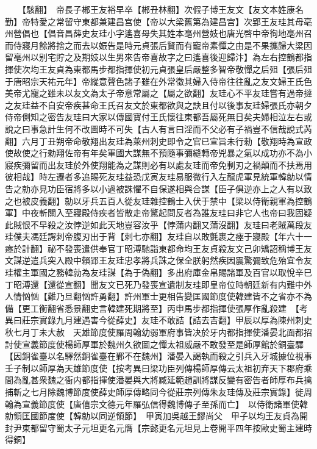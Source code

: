　　【駭翻】　帝長子郴王友裕早卒【郴丑林翻】次假子博王友文【友文本姓康名勤】帝特愛之常留守東都兼建昌宫使【帝以大梁舊第為建昌宫】次郢王友珪其母亳州營倡也【倡音昌薛史友珪小字遙喜母失其姓本亳州營妓也唐光啓中帝徇地亳州召而侍寢月餘將捨之而去以娠告是時元貞張后賢而有寵帝素憚之由是不果攜歸大梁因留亳州以别宅貯之及期妓以生男來告帝喜故字之曰遙喜後迎歸汴】為左右控鶴都指揮使次均王友貞為東都馬步都指揮使初元貞張皇后嚴整多智帝敬憚之后殂【張后殂于唐昭宗天祐元年】帝縱意聲色諸子雖在外常徵其婦入侍帝往往亂之友文婦王氏色美帝尤寵之雖未以友文為太子帝意常屬之【屬之欲翻】友珪心不平友珪嘗有過帝撻之友珪益不自安帝疾甚命王氏召友文於東都欲與之訣且付以後事友珪婦張氏亦朝夕侍帝側知之密告友珪曰大家以傳國寶付王氏懷往東都吾屬死無日矣夫婦相泣左右或說之曰事急計生何不改圖時不可失【古人有言曰淫而不父必有子禍豈不信哉說式芮翻】六月丁丑朔帝命敬翔出友珪為萊州刺史即令之官已宣旨未行勑【敬翔時為宣政使故使之行勑翔佐帝有年矣軍國大謀無不預隨事彌縫轉帝兇暴之氣以成功亦不為小寢疾彌留而出友珪於外使翔能為之謀則必有以處友珪而帝免剚刃之禍顛而不扶焉用彼相哉】時左遷者多追賜死友珪益恐戊寅友珪易服微行入左龍虎軍見統軍韓勍以情告之勍亦見功臣宿將多以小過被誅懼不自保遂相與合謀【臣子俱逆亦上之人有以致之也被皮義翻】勍以牙兵五百人從友珪雜控鶴士入伏于禁中【梁以侍衛親軍為控鶴軍】中夜斬關入至寢殿侍疾者皆散走帝驚起問反者為誰友珪曰非它人也帝曰我固疑此賊恨不早殺之汝悖逆如此天地豈容汝乎【悖蒲内翻又蒲沒翻】友珪曰老賊萬段友珪僕夫馮廷諤刺帝腹刃出于背【刺七亦翻】友珪自以敗氈裹之瘞于寢殿【年六十一瘞於計翻】祕不發喪遣供奉官丁昭溥馳詣東都命均王友貞殺友文己卯矯詔稱博王友文謀逆遣兵突入殿中賴郢王友珪忠孝將兵誅之保全朕躬然疾因震驚彌致危殆宜令友珪權主軍國之務韓勍為友珪謀【為于偽翻】多出府庫金帛賜諸軍及百官以取悅辛巳丁昭溥還【還從宣翻】聞友文已死乃發喪宣遺制友珪即皇帝位時朝廷新有内難中外人情忷忷【難乃旦翻忷許勇翻】許州軍士更相告變匡國節度使韓建皆不之省亦不為備【更工衡翻省悉景翻史言韓建死期將至】丙申馬步都指揮使張厚作亂殺建　【考異曰莊宗實錄九月建遇害今從薛史】友珪不敢詰【詰去吉翻】甲辰以厚為陳州刺史　秋七月丁未大赦　天雄節度使羅周翰幼弱軍府事皆决於牙内都指揮使潘晏北面都招討使宣義節度使楊師厚軍於魏州久欲圖之憚太祖威嚴不敢發至是師厚館於銅臺驛【因銅雀臺以名驛然銅雀臺在鄴不在魏州】潘晏入謁執而殺之引兵入牙城據位視事壬子制以師厚為天雄節度使【按考異曰梁功臣列傳楊師厚傳云太祖初弃天下郡府乘間為亂甚衆魏之衙内都指揮使潘晏與大將臧延範趙訓將謀反變有密告者師厚布兵擒捕斬之七月除魏博節度使薛史師厚傳略同今從莊宗列傳朱友珪傳及莊宗實錄】徙周翰為宣義節度使【唐僖宗文德元年羅弘信得魏博傳子至孫而亡】　以侍衛諸軍使韓勍領匡國節度使【韓勍以同逆領節】　甲寅加吳越王鏐尚父　甲子以均王友貞為開封尹東都留守蜀太子元坦更名元膺【宗懿更名元坦見上卷開平四年按歐史蜀主建時得銅】

